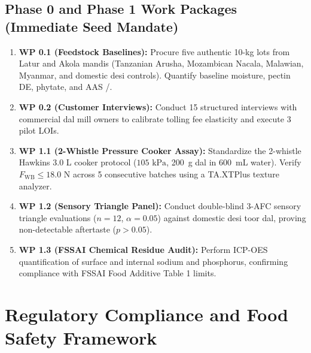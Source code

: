 \documentclass[10pt,a4paper]{article}
\begin{document}
\subsection{Phase 0 and Phase 1 Work Packages (Immediate Seed Mandate)}
\begin{enumerate}[leftmargin=*]
    \item \textbf{WP 0.1 (Feedstock Baselines):} Procure five authentic 10-kg lots from Latur and Akola mandis (Tanzanian Arusha, Mozambican Nacala, Malawian, Myanmar, and domestic desi controls). Quantify baseline moisture, pectin DE, phytate, and AAS /.
    \item \textbf{WP 0.2 (Customer Interviews):} Conduct 15 structured interviews with commercial dal mill owners to calibrate tolling fee elasticity and execute 3 pilot LOIs.
    \item \textbf{WP 1.1 (2-Whistle Pressure Cooker Assay):} Standardize the 2-whistle Hawkins 3.0 L cooker protocol ($105\text{ kPa}$, 200~g dal in 600~mL water). Verify $F_{\mathrm{WB}} \le 18.0\text{ N}$ across 5 consecutive batches using a TA.XTPlus texture analyzer.
    \item \textbf{WP 1.2 (Sensory Triangle Panel):} Conduct double-blind 3-AFC sensory triangle evaluations ($n=12$, $\alpha=0.05$) against domestic desi toor dal, proving non-detectable aftertaste ($p > 0.05$).
    \item \textbf{WP 1.3 (FSSAI Chemical Residue Audit):} Perform ICP-OES quantification of surface and internal sodium and phosphorus, confirming compliance with FSSAI Food Additive Table 1 limits.
\end{enumerate}

\section{Regulatory Compliance and Food Safety Framework}
\end{document}

